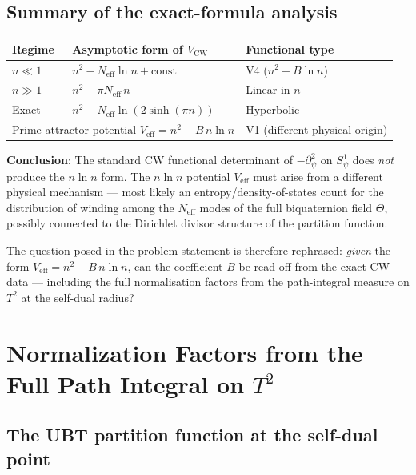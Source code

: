 \documentclass[12pt,a4paper]{article}
\theoremstyle{definition}
\theoremstyle{remark}
\begin{document}
\subsection{Summary of the exact-formula analysis}

\begin{center}
\renewcommand{\arraystretch}{1.3}
\begin{tabular}{lll}
\toprule
Regime & Asymptotic form of $V_{\mathrm{CW}}$ & Functional type \\
\midrule
$n \ll 1$ & $n^2 - N_{\mathrm{eff}}\ln n + \mathrm{const}$ & V4 ($n^2 - B\ln n$) \\
$n \gg 1$ & $n^2 - \pi N_{\mathrm{eff}}\,n$ & Linear in $n$ \\
Exact & $n^2 - N_{\mathrm{eff}}\ln(2\sinh(\pi n))$ & Hyperbolic \\
\midrule
\multicolumn{2}{l}{Prime-attractor potential $V_{\mathrm{eff}} = n^2 - B\,n\ln n$}
  & V1 (different physical origin) \\
\bottomrule
\end{tabular}
\end{center}

\begin{gapbox}
\textbf{Conclusion}: The standard CW functional determinant of
$-\partial^2_\psi$ on $S^1_\psi$ does \emph{not} produce the
$n\ln n$ form.  The $n\ln n$ potential $V_{\mathrm{eff}}$ must arise from
a different physical mechanism — most likely an entropy/density-of-states
count for the distribution of winding among the $N_{\mathrm{eff}}$ modes
of the full biquaternion field $\Theta$, possibly connected to the
Dirichlet divisor structure of the partition function.

The question posed in the problem statement is therefore rephrased:
\emph{given} the form $V_{\mathrm{eff}} = n^2 - B\,n\ln n$, can the coefficient
$B$ be read off from the exact CW data — including the full normalisation
factors from the path-integral measure on $T^2$ at the self-dual radius?
\end{gapbox}

\section{Normalization Factors from the Full Path Integral on $T^2$}
\label{sec:cw:norm}

\subsection{The UBT partition function at the self-dual point}
\end{document}
